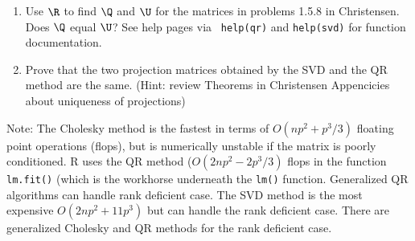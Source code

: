 \documentclass[12pt]{article}
\begin{document}
\begin{enumerate}
\begin{enumerate}
\item Use $\R$ to find $\Q$ and $\U$ for the matrices in problems 1.5.8 in
  Christensen. Does $\Q$ equal $\U$?   See help pages via {\tt
    help(qr)} and {\tt help(svd)} for function documentation.
\item Prove that the two projection matrices obtained by the SVD and
  the QR method are the same.  (Hint:  review Theorems in Christensen
  Appencicies about uniqueness of projections)

  \end{enumerate}
  Note: The Cholesky method is the fastest in terms of
  $O(n p^2 + p^3/3)$ floating point operations (flops), but is
  numerically unstable if the matrix is poorly conditioned.  R uses
  the QR method ($O(2 n p^2 - 2p^3/3)$ flops in the function {\tt lm.fit()}
  (which is the workhorse underneath the {\tt lm()} function.  Generalized QR
  algorithms can handle rank deficient case.  The SVD method is the
  most expensive $O(2 n p^2 + 11 p^3)$ but can handle the rank deficient case.
  There are generalized Cholesky and QR methods for the rank deficient
  case.
\end{enumerate}
\end{document}
